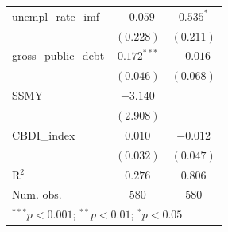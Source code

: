 \begin{table}
\begin{center}
\begin{tabular}{l c c}
unempl\_rate\_imf   & $-0.059$       & $0.535^{*}$  \\
                    & $(0.228)$      & $(0.211)$    \\
gross\_public\_debt & $0.172^{***}$  & $-0.016$     \\
                    & $(0.046)$      & $(0.068)$    \\
SSMY                & $-3.140$       &              \\
                    & $(2.908)$      &              \\
CBDI\_index         & $0.010$        & $-0.012$     \\
                    & $(0.032)$      & $(0.047)$    \\
\hline
R$^2$               & $0.276$        & $0.806$      \\
Num. obs.           & $580$          & $580$        \\
\hline
\multicolumn{3}{l}{\scriptsize{$^{***}p<0.001$; $^{**}p<0.01$; $^{*}p<0.05$}}
\end{tabular}
\label{table:coefficients}
\end{center}
\end{table}
